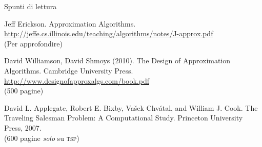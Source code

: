 \begin{frame}{Spunti di lettura}

\vspace{-9pt}
\begin{myboxtitle}[Bibliografia]
\BIL
\item Jeff Erickson. Approximation Algorithms. \\ \url{http://jeffe.cs.illinois.edu/teaching/algorithms/notes/J-approx.pdf}\\
(Per approfondire)
\item David Williamson, David Shmoys (2010). The Design of Approximation Algorithms. Cambridge University Press.\\
\url{http://www.designofapproxalgs.com/book.pdf}\\
(500 pagine)
\item David L. Applegate, Robert E. Bixby, Vašek Chvátal, and William J. Cook. The Traveling Salesman Problem: A Computational Study. Princeton University Press, 2007.\\
(600 pagine \emph{solo} su \textsc{tsp})
\EIL
\end{myboxtitle}


\end{frame}

